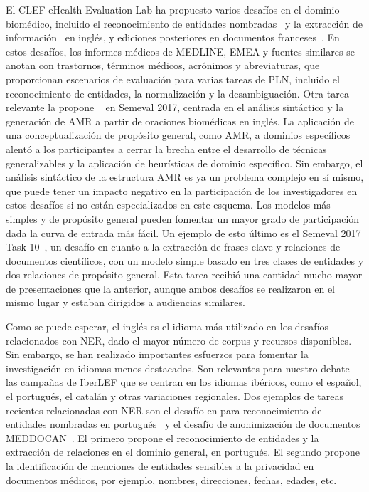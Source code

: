 El CLEF eHealth Evaluation Lab ha propuesto varios desafíos en el dominio biomédico, incluido el reconocimiento de entidades nombradas~\cite{clef2013} y la extracción de información~\cite{clef2014} en inglés, y ediciones posteriores en documentos franceses~\cite{clef2015, clef2016}.
En estos desafíos, los informes médicos de MEDLINE, EMEA y fuentes similares se anotan con trastornos, términos médicos, acrónimos y abreviaturas, que proporcionan escenarios de evaluación para varias tareas de PLN, incluido el reconocimiento de entidades, la normalización y la desambiguación.
Otra tarea relevante la propone ~\citet{semeval2017-task9} en Semeval 2017, centrada en el análisis sintáctico y la generación de AMR a partir de oraciones biomédicas en inglés.
La aplicación de una conceptualización de propósito general, como AMR, a dominios específicos alentó a los participantes a cerrar la brecha entre el desarrollo de técnicas generalizables y la aplicación de heurísticas de dominio específico.
Sin embargo, el análisis sintáctico de la estructura AMR es ya un problema complejo en sí mismo, que puede tener un impacto negativo en la participación de los investigadores en estos desafíos si no están especializados en este esquema.
Los modelos más simples y de propósito general pueden fomentar un mayor grado de participación dada la curva de entrada más fácil.
Un ejemplo de esto último es el Semeval 2017 Task 10~\cite{semeval2017-task10}, un desafío en cuanto a la extracción de frases clave y relaciones de documentos científicos, con un modelo simple basado en tres clases de entidades y dos relaciones de propósito general.
Esta tarea recibió una cantidad mucho mayor de presentaciones que la anterior, aunque ambos desafíos se realizaron en el mismo lugar y estaban dirigidos a audiencias similares.

Como se puede esperar, el inglés es el idioma más utilizado en los desafíos relacionados con NER, dado el mayor número de corpus y recursos disponibles.
Sin embargo, se han realizado importantes esfuerzos para fomentar la investigación en idiomas menos destacados.
Son relevantes para nuestro debate las campañas de IberLEF que se centran en los idiomas ibéricos, como el español, el portugués, el catalán y otras variaciones regionales.
Dos ejemplos de tareas recientes relacionadas con NER son el desafío en para reconocimiento de entidades nombradas en portugués~\cite{glauber2019iberlef} y el desafío de anonimización de documentos MEDDOCAN~\cite{marimon2019automatic}.
El primero propone el reconocimiento de entidades y la extracción de relaciones en el dominio general, en portugués.
El segundo propone la identificación de menciones de entidades sensibles a la privacidad en documentos médicos, por ejemplo, nombres, direcciones, fechas, edades, etc.

